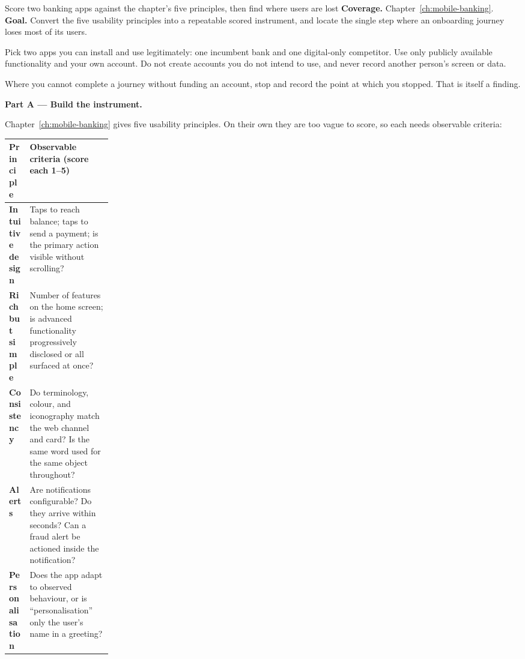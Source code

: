 
\begin{labproject}{Score two banking apps against the chapter's five principles, then find where users are lost}
\textbf{Coverage.} Chapter~\ref{ch:mobile-banking}.\\
\textbf{Goal.} Convert the five usability principles into a repeatable scored instrument, and locate the single step where an onboarding journey loses most of its users.

\begin{labmode}
Pick two apps you can install and use legitimately: one incumbent bank and one digital-only competitor. Use only publicly available functionality and your own account. Do not create accounts you do not intend to use, and never record another person's screen or data.

Where you cannot complete a journey without funding an account, stop and record the point at which you stopped. That is itself a finding.
\end{labmode}

\medskip\noindent\textbf{Part A --- Build the instrument.}\par
Chapter~\ref{ch:mobile-banking} gives five usability principles. On their own they are too vague to score, so each needs observable criteria:

\begin{mltable}
\begin{tabularx}{\linewidth}{@{}>{\bfseries\leavevmode\color{MLNavy}}p{0.20\linewidth}X@{}}
\toprule
\rowcolor{MLPaleBlue!92}
Principle & Observable criteria (score each 1--5) \\
\midrule
Intuitive design & Taps to reach balance; taps to send a payment; is the primary action visible without scrolling? \\
Rich but simple & Number of features on the home screen; is advanced functionality progressively disclosed or all surfaced at once? \\
Consistency & Do terminology, colour, and iconography match the web channel and card? Is the same word used for the same object throughout? \\
Alerts & Are notifications configurable? Do they arrive within seconds? Can a fraud alert be actioned inside the notification? \\
Personalisation & Does the app adapt to observed behaviour, or is ``personalisation'' only the user's name in a greeting? \\
\bottomrule
\end{tabularx}
\end{mltable}


\end{labproject}
